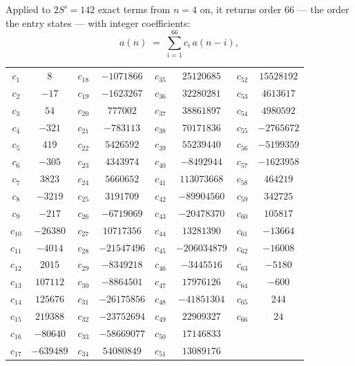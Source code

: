 \documentclass[11pt,a4paper]{article}
\theoremstyle{plain}
\theoremstyle{definition}
\begin{document}
Applied to $2S'=142$ exact terms from $n=4$ on, it returns order $66$ --- the
order the entry states --- with integer coefficients:
\[
a(n)\;=\;\sum_{i=1}^{66}c_i\,a(n-i),
\]
\begin{center}\small
\begin{tabular}{cccccccc}
$c_{1}$ & $8$ & $c_{18}$ & $-1071866$ & $c_{35}$ & $25120685$ & $c_{52}$ & $15528192$ \\
$c_{2}$ & $-17$ & $c_{19}$ & $-1623267$ & $c_{36}$ & $32280281$ & $c_{53}$ & $4613617$ \\
$c_{3}$ & $54$ & $c_{20}$ & $777002$ & $c_{37}$ & $38861897$ & $c_{54}$ & $4980592$ \\
$c_{4}$ & $-321$ & $c_{21}$ & $-783113$ & $c_{38}$ & $70171836$ & $c_{55}$ & $-2765672$ \\
$c_{5}$ & $419$ & $c_{22}$ & $5426592$ & $c_{39}$ & $55239440$ & $c_{56}$ & $-5199359$ \\
$c_{6}$ & $-305$ & $c_{23}$ & $4343974$ & $c_{40}$ & $-8492944$ & $c_{57}$ & $-1623958$ \\
$c_{7}$ & $3823$ & $c_{24}$ & $5660652$ & $c_{41}$ & $113073668$ & $c_{58}$ & $464219$ \\
$c_{8}$ & $-3219$ & $c_{25}$ & $3191709$ & $c_{42}$ & $-89904560$ & $c_{59}$ & $342725$ \\
$c_{9}$ & $-217$ & $c_{26}$ & $-6719069$ & $c_{43}$ & $-20478370$ & $c_{60}$ & $105817$ \\
$c_{10}$ & $-26380$ & $c_{27}$ & $10717356$ & $c_{44}$ & $13281390$ & $c_{61}$ & $-13664$ \\
$c_{11}$ & $-4014$ & $c_{28}$ & $-21547496$ & $c_{45}$ & $-206034879$ & $c_{62}$ & $-16008$ \\
$c_{12}$ & $2015$ & $c_{29}$ & $-8349218$ & $c_{46}$ & $-3445516$ & $c_{63}$ & $-5180$ \\
$c_{13}$ & $107112$ & $c_{30}$ & $-8864501$ & $c_{47}$ & $17976126$ & $c_{64}$ & $-600$ \\
$c_{14}$ & $125676$ & $c_{31}$ & $-26175856$ & $c_{48}$ & $-41851304$ & $c_{65}$ & $244$ \\
$c_{15}$ & $219388$ & $c_{32}$ & $-23752694$ & $c_{49}$ & $22909327$ & $c_{66}$ & $24$ \\
$c_{16}$ & $-80640$ & $c_{33}$ & $-58669077$ & $c_{50}$ & $17146833$ &  &  \\
$c_{17}$ & $-639489$ & $c_{34}$ & $54080849$ & $c_{51}$ & $13089176$ &  &  \\
\end{tabular}
\end{center}
\end{document}
